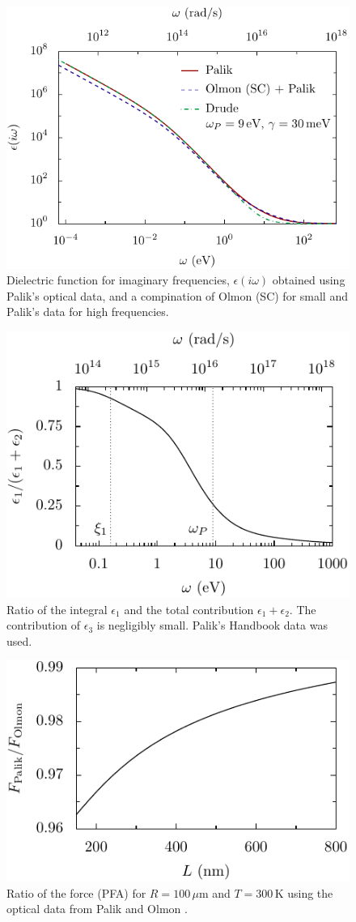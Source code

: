\documentclass[twocolumn,superscriptaddress,pre]{revtex4-1}
\begin{document}
\begin{figure}
\includegraphics[width=0.95\columnwidth]{img/eps_imag.pdf}
\caption{Dielectric function for imaginary frequencies, $\epsilon(i\omega)$
obtained using Palik's optical data, and a compination of Olmon (SC) for small
and Palik's data for high frequencies.}
\label{fig:eps_imag}
\end{figure}

\begin{figure}
\includegraphics[width=0.7\columnwidth]{img/ratio.pdf}
\caption{Ratio of the integral $\epsilon_1$ and the total contribution
$\epsilon_1+\epsilon_2$. The contribution of $\epsilon_3$ is negligibly small. Palik's Handbook data was used.}
\label{fig:ratio}
\end{figure}

\begin{figure}
\includegraphics[width=0.7\columnwidth]{img/diff.pdf}
\caption{Ratio of the force (PFA) for $R=100\,\mu$m and $T=300\,$K using the optical data from Palik \cite{Palik1995} and Olmon \cite{Olmon2012}.}
\label{fig:diff}
\end{figure}
\end{document}
